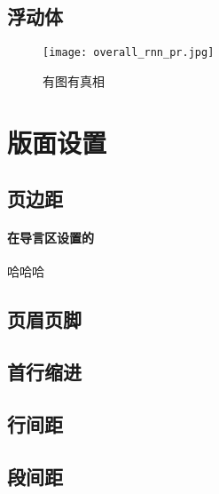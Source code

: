 \documentclass[UTF8]{ctexart}
\begin{document}
\subsection{浮动体}
\begin{figure}[htbp]
\centering
\texttt{[image: overall\_rnn\_pr.jpg]}
\caption{有图有真相}
\label{fig:myphoto}
\end{figure}

\section{版面设置}
\subsection{页边距}
\paragraph{在导言区设置的} 哈哈哈

\subsection{页眉页脚}


\subsection{首行缩进}
\subsection{行间距}
\subsection{段间距}
\end{document}
